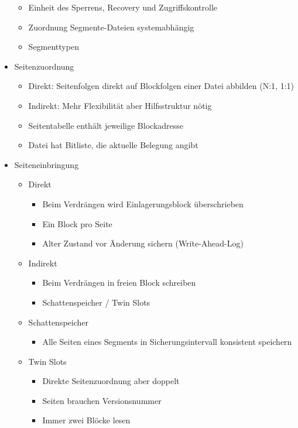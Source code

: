 \documentclass[11pt, paper=a4, twocolumn]{scrartcl}
\begin{document}
\begin{itemize}
\begin{itemize}
					\item Einheit des Sperrens, Recovery und 
						Zugriffskontrolle
					\item Zuordnung Segmente-Dateien systemabhängig
					\item Segmenttypen
				\end{itemize}
			\item Seitenzuordnung
				\begin{itemize}
					\item Direkt: Seitenfolgen direkt auf Blockfolgen 
						einer Datei abbilden (N:1, 1:1)
					\item Indirekt: Mehr Flexibilität aber 
						Hilfsstruktur nötig
					\item Seitentabelle enthält jeweilige Blockadresse
					\item Datei hat Bitliste, die aktuelle Belegung 
						angibt
				\end{itemize}
			\item Seiteneinbringung
				\begin{itemize}
					\item Direkt
						\begin{itemize}
							\item Beim Verdrängen wird 
								Einlagerungsblock 
								überschrieben
							\item Ein Block pro Seite
							\item Alter Zustand vor Änderung 
								sichern (Write-Ahead-Log)
						\end{itemize}
					\item Indirekt
						\begin{itemize}
							\item Beim Verdrängen in freien 
								Block schreiben
							\item Schattenspeicher / Twin 
								Slots
						\end{itemize}
					\item Schattenspeicher
						\begin{itemize}
							\item Alle Seiten eines Segments 
								in Sicherungsintervall 
								konsistent speichern
						\end{itemize}
					\item Twin Slots
						\begin{itemize}
							\item Direkte Seitenzuordnung aber 
								doppelt
							\item Seiten brauchen 
								Versionsnummer
							\item Immer zwei Blöcke lesen
						\end{itemize}
				\end{itemize}
			
		\end{itemize}
\end{document}
